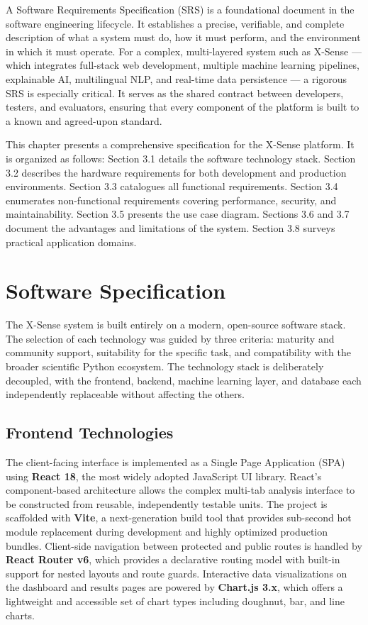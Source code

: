\documentclass[12pt, a4paper]{report}
\begin{document}
A Software Requirements Specification (SRS) is a foundational document in the software engineering lifecycle. It establishes a precise, verifiable, and complete description of what a system must do, how it must perform, and the environment in which it must operate. For a complex, multi-layered system such as X-Sense --- which integrates full-stack web development, multiple machine learning pipelines, explainable AI, multilingual NLP, and real-time data persistence --- a rigorous SRS is especially critical. It serves as the shared contract between developers, testers, and evaluators, ensuring that every component of the platform is built to a known and agreed-upon standard.

This chapter presents a comprehensive specification for the X-Sense platform. It is organized as follows: Section 3.1 details the software technology stack. Section 3.2 describes the hardware requirements for both development and production environments. Section 3.3 catalogues all functional requirements. Section 3.4 enumerates non-functional requirements covering performance, security, and maintainability. Section 3.5 presents the use case diagram. Sections 3.6 and 3.7 document the advantages and limitations of the system. Section 3.8 surveys practical application domains.

\section{Software Specification}

The X-Sense system is built entirely on a modern, open-source software stack. The selection of each technology was guided by three criteria: maturity and community support, suitability for the specific task, and compatibility with the broader scientific Python ecosystem. The technology stack is deliberately decoupled, with the frontend, backend, machine learning layer, and database each independently replaceable without affecting the others.

\subsection{Frontend Technologies}

The client-facing interface is implemented as a Single Page Application (SPA) using \textbf{React 18}, the most widely adopted JavaScript UI library. React's component-based architecture allows the complex multi-tab analysis interface to be constructed from reusable, independently testable units. The project is scaffolded with \textbf{Vite}, a next-generation build tool that provides sub-second hot module replacement during development and highly optimized production bundles. Client-side navigation between protected and public routes is handled by \textbf{React Router v6}, which provides a declarative routing model with built-in support for nested layouts and route guards. Interactive data visualizations on the dashboard and results pages are powered by \textbf{Chart.js 3.x}, which offers a lightweight and accessible set of chart types including doughnut, bar, and line charts.
\end{document}
